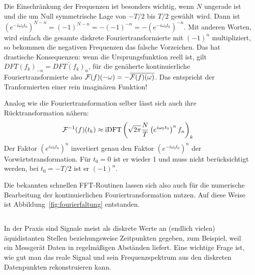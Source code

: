 Die Einschränkung der Frequenzen ist besonders wichtig, wenn $N$
ungerade ist und die um Null symmetrische Lage von $-T/2$ bis $T/2$
gewählt wird. Dann ist $\left(e^{-i\omega_0 t_0}\right)^{N-n} =
(-1)^{N-n} = - (-1)^{-n} = -\left(e^{-i\omega_0 t_0}\right)^{-n}$. Mit
anderen Worten, wird einfach die gesamte diskrete
Fouriertransformierte mit $(-1)^n$ multipliziert, so bekommen die
negativen Frequenzen das falsche Vorzeichen. Das hat drastische
Konsequenzen: wenn die Ursprungsfunktion reell ist, gilt
$DFT(f_k)_{-n}=\overline{DFT(f_k)}_{n}$, für die genäherte
kontinuierliche Fouriertransformierte also
$\mathcal F(f)(-\omega)=-\overline{\mathcal F(f)(\omega)}$. Das entspricht der
Tranformierten einer rein imaginären Funktion!

Analog wie die Fouriertransformation selber lässt sich auch ihre
Rücktransformation nähern:
\begin{equation}
  \label{eq:idftcont}
  \mathcal F^{-1}(f)(t_k)\approx
  \text{iDFT}\left(\sqrt{2\pi}\frac{N}{T}\left(e^{i\omega_0 t_0}\right)^n f_n\right)_k
\end{equation}
Der Faktor $\left(e^{i\omega_0 t_0}\right)^n$ invertiert genau den
Faktor $\left(e^{-i\omega_0 t_0}\right)^n$ der
Vorwärtstransformation. Für $t_0=0$ ist er wieder 1 und muss nicht
berücksichtigt werden, bei $t_0=-T/2$ ist er $(-1)^n$.

Die bekannten schnellen FFT-Routinen lassen sich also auch für die
numerische Bearbeitung der kontinuierlichen Fouriertransformation
nutzen. Auf diese Weise ist \zb Abbildung~\ref{fig:fourierfaltung}
entstanden.

\subsection{}

In der Praxis sind Signale meist als diskrete Werte an (endlich
vielen) äquidistanten Stellen beziehungsweise Zeitpunkten gegeben, zum
Beispiel, weil ein Messgerät Daten in regelmäßigen Abständen liefert.
Eine wichtige Frage ist, wie gut man das reale Signal und sein
Frequenzspektrum aus den diskreten Datenpunkten rekonstruieren kann.

